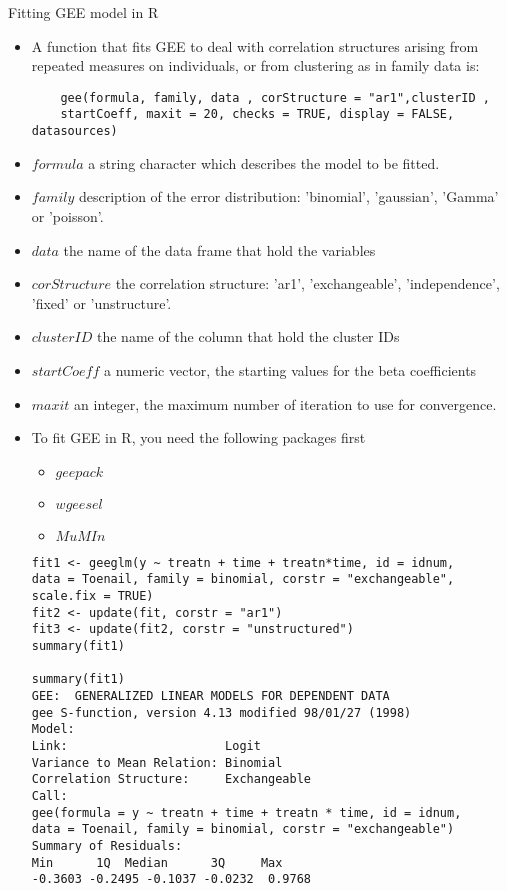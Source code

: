 \documentclass{beamer}
\begin{document}
\begin{frame}[fragile]{Fitting GEE model in R}
\begin{itemize}
	\item A function that fits GEE to deal with correlation structures arising from repeated measures on individuals, or from clustering as in family data is: 
	\begin{verbatim}
	gee(formula, family, data , corStructure = "ar1",clusterID , 
	startCoeff, maxit = 20,	checks = TRUE, display = FALSE, datasources)
	\end{verbatim}
	\item $formula$	a string character which describes the model to be fitted.
	\item $family$	description of the error distribution: 'binomial', 'gaussian', 'Gamma' or 'poisson'.
	\item $data$ the name of the data frame that hold the variables 
	\item $corStructure$ the correlation structure: 'ar1', 'exchangeable', 'independence', 'fixed' or 'unstructure'.
    \item $clusterID$ the name of the column that hold the cluster IDs
	\item $startCoeff$ a numeric vector, the starting values for the beta coefficients
   \item $maxit$ an integer, the maximum number of iteration to use for convergence.
\end{itemize}
\end{frame}

\begin{frame}[fragile]{}
\begin{itemize}
	\item To fit GEE in R, you need the following packages first
	\begin{itemize}
		\item $geepack$
		\item $wgeesel$
		\item $MuMIn$
	\end{itemize}
\scriptsize
\begin{verbatim}
fit1 <- geeglm(y ~ treatn + time + treatn*time, id = idnum, 
data = Toenail, family = binomial, corstr = "exchangeable", 
scale.fix = TRUE)
fit2 <- update(fit, corstr = "ar1")
fit3 <- update(fit2, corstr = "unstructured")
summary(fit1)

summary(fit1)
GEE:  GENERALIZED LINEAR MODELS FOR DEPENDENT DATA
gee S-function, version 4.13 modified 98/01/27 (1998) 
Model:
Link:                      Logit 
Variance to Mean Relation: Binomial 
Correlation Structure:     Exchangeable 
Call:
gee(formula = y ~ treatn + time + treatn * time, id = idnum, 
data = Toenail, family = binomial, corstr = "exchangeable")
Summary of Residuals:
Min      1Q  Median      3Q     Max 
-0.3603 -0.2495 -0.1037 -0.0232  0.9768 
\end{verbatim}
\end{itemize}
\end{frame}
\end{document}
